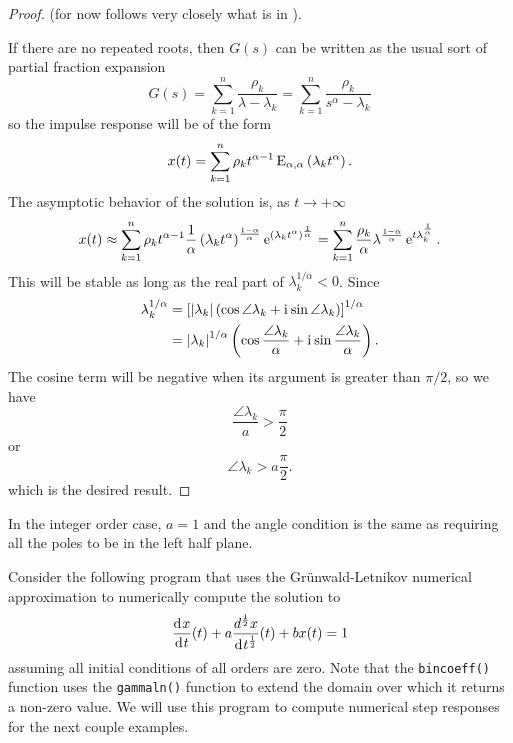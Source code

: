 \begin{proof}
  (for now follows very closely what is in \cite{fraccontrol}).

  If there are no repeated roots, then $G(s)$ can be written as the usual sort of partial fraction expansion
  \begin{equation*}
    G(s) = \sum_{k=1}^n \frac{\rho_k}{\lambda - \lambda_k} =  \sum_{k=1}^n \frac{\rho_k}{s^\alpha - \lambda_k}
  \end{equation*}
  so the impulse response will be of the form
  \begin{equation*}
    x(t) = \sum_{k=1}^n \rho_k t^{\alpha-1} \operatorname{E}_{\alpha,\alpha} \left( \lambda_k t^\alpha \right).
  \end{equation*}
  The asymptotic behavior of the solution is, as $t \rightarrow +\infty$
  \begin{equation*}
    x(t) \approx \sum_{k=1}^n \rho_k t^{\alpha-1} \frac{1}{\alpha} \left( \lambda_k t^\alpha \right)^\frac{1-\alpha}{\alpha} \operatorname{e}^{\left( \lambda_k t^\alpha \right)^\frac{1}{\alpha}} = \sum_{k=1}^n \frac{\rho_k}{\alpha}\lambda^{\frac{1-\alpha}{\alpha}}\operatorname{e}^{t \lambda_k^\frac{1}{\alpha}}.
  \end{equation*}
  This will be stable as long as the real part of $\lambda_k^{1/\alpha} < 0$. Since
  \begin{align*}
    \lambda_k^{1/\alpha} &= \left[ \left| \lambda_k \right| \left( \cos \angle \lambda_k + \mathrm{i}\mkern1mu \sin \angle \lambda_k \right) \right]^{1/\alpha} \\
    &= \left| \lambda_k \right|^{1/\alpha} \left( \cos \frac{\angle \lambda_k}{\alpha} + \mathrm{i}\mkern1mu \sin \frac{\angle \lambda_k}{\alpha} \right).
  \end{align*}
  The cosine term will be negative when its argument is greater than $\pi/2$, so we have
  \begin{equation*}
    \frac{\angle \lambda_k}{a} > \frac{\pi}{2}
  \end{equation*}
  or
  \begin{equation*}
    \angle \lambda_k > a \frac{\pi}{2}.
  \end{equation*}
  which is the desired result.
\end{proof}

\begin{remark}
  In the integer order case, $a = 1$ and the angle condition is the same as requiring all the poles to be in the left half plane.
\end{remark}

Consider the following program that uses the Gr\"unwald-Letnikov numerical approximation to numerically compute the solution to
\begin{equation*}
  \frac{\operatorname{d}\hspace*{-1pt} x}{\operatorname{d}\hspace*{-1pt} t}(t) + a \frac{d^\frac{1}{2} x}{\operatorname{d}\hspace*{-1pt} t^\frac{1}{2}}(t) + b x(t) = 1
\end{equation*}
assuming all initial conditions of all orders are zero. Note that the \texttt{bincoeff()} function uses the \texttt{gammaln()} function to extend the domain over which it returns a non-zero value. We will use this program to compute numerical step responses for the next couple examples.


